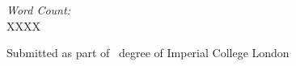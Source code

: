 \begin{titlepage}
\vspace*{2em}
\begin{center}
	\emph{Word Count:}\\
	XXXX
\end{center}

\vfill %
Submitted as part of 
\degreetype~degree of Imperial College London\\[0.5cm]

\makeatletter
\@date 
\makeatother


\end{titlepage}
